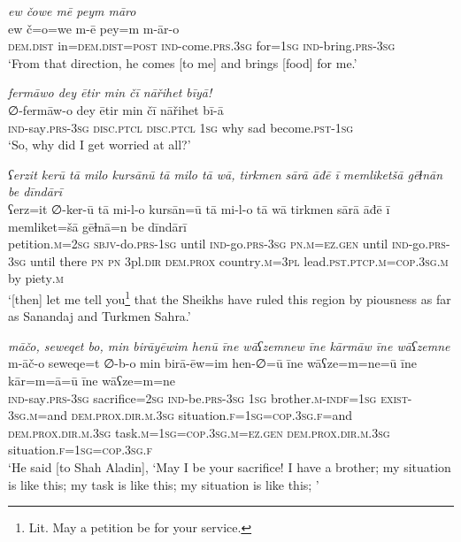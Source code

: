 \ea \label{PM.48}
\textit{ew čowe mē peym māro} \\ 
\gll ew č=o=we m-ē pey=m m-ār-o \\ 
 \textsc{dem.dist} in=\textsc{dem.dist}\textsc{=\textsc{post}} \textsc{ind-}come\textsc{.prs}\textsc{.3sg} for\textsc{=\textsc{1sg}} \textsc{ind-}bring\textsc{.prs}\textsc{-3sg} \\ 
\glt `From that direction, he  comes [to me] and brings [food] for me.'
\z 
 
\ea \label{PM.49}
\textit{fermāwo dey ētir min čī nāřihet bīyā!} \\ 
\gll ∅-fermāw-o dey ētir min čī nāřihet bī-ā \\ 
 \textsc{ind-}say\textsc{.prs}\textsc{-3sg} \textsc{disc.ptcl} \textsc{disc.ptcl} \textsc{1sg} why sad become\textsc{.pst}\textsc{-\textsc{1sg}} \\ 
\glt `So, why did I get worried at all?'
\z 
 
\ea \label{DG.10}
\textit{ʕerzit kerū tā milo kursānū tā milo tā wā, tirkmen sārā āđē ī memliketšā gēɫnān be dīndārī} \\ 
\gll ʕerz=it ∅-ker-ū tā mi-l-o kursān=ū tā mi-l-o tā wā tirkmen sārā āđē ī memliket=šā gēɫnā=n be dīndārī \\ 
 petition\textsc{.m}\textsc{=\textsc{2sg}} \textsc{sbjv-}do\textsc{.prs}\textsc{-1sg} until \textsc{ind-}go\textsc{.prs}\textsc{-3sg} \textsc{pn}\textsc{.m}\textsc{=ez}\textsc{.gen} until \textsc{ind-}go\textsc{.prs}\textsc{-3sg} until there \textsc{pn} \textsc{pn} 3pl\textsc{.dir} \textsc{dem.prox} country\textsc{.m}\textsc{=3pl} lead\textsc{.pst}\textsc{.ptcp}\textsc{.m}\textsc{=cop}\textsc{.3sg}\textsc{.m} by piety\textsc{.m} \\ 
\glt `[then] let me tell you\footnote{Lit. May a petition be for your service.} that the Sheikhs have ruled this region by piousness as far as Sanandaj and Turkmen Sahra.'
\z 
 
\ea \label{DG.34}
\textit{māčo, seweqet bo, min birāyēwim henū īne wāʕzemnew īne kārmāw īne wāʕzemne} \\ 
\gll m-āč-o seweqe=t ∅-b-o min birā-ēw=im hen-∅=ū īne wāʕze=m=ne=ū īne kār=m=ā=ū īne wāʕze=m=ne \\ 
 \textsc{ind-}say\textsc{.prs}\textsc{-3sg} sacrifice\textsc{=\textsc{2sg}} \textsc{ind-}be\textsc{.prs}\textsc{-3sg} \textsc{1sg} brother\textsc{.m}\textsc{-indf}\textsc{=1sg} \textsc{exist}\textsc{-3sg}\textsc{.m}=and \textsc{dem.prox}\textsc{.dir}\textsc{.m}\textsc{.3sg} situation\textsc{\textsc{.f}}\textsc{=1sg}\textsc{=\textsc{cop.3sg\textsc{.f}}}=and \textsc{dem.prox}\textsc{.dir}\textsc{.m}\textsc{.3sg} task\textsc{.m}\textsc{=1sg}\textsc{=cop}\textsc{.3sg}\textsc{.m}\textsc{=ez}\textsc{.gen} \textsc{dem.prox}\textsc{.dir}\textsc{.m}\textsc{.3sg} situation\textsc{\textsc{.f}}\textsc{=1sg}\textsc{=\textsc{cop.3sg\textsc{.f}}} \\ 
\glt `He said [to Shah Aladin], ‘May I be your sacrifice! I have a brother; my situation is like this; my task is like this; my situation is like this; '
\z 
 
